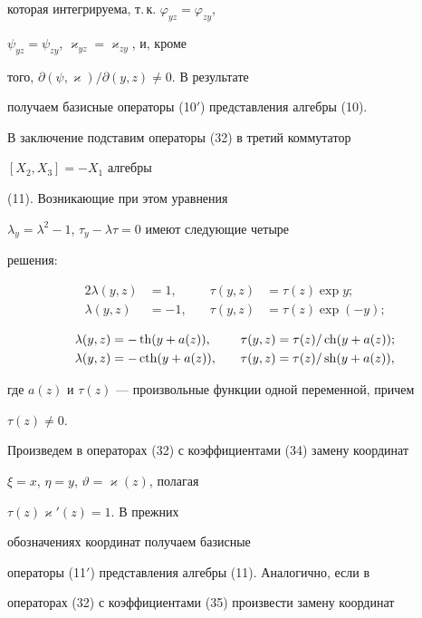 которая интегрируема, т.\,к. $\varphi_{yz}=\varphi_{zy}$, 


$\psi_{yz}=\psi_{zy}$, $\varkappa_{yz}=\varkappa_{zy}$, и, кроме 


того, $\partial(\psi,\varkappa)/\partial(y,z)\ne 0$. В результате 


получаем базисные операторы (10${}'$) представления алгебры (10). 


 


В заключение подставим операторы (32) в третий коммутатор 


$[X_2,X_3]=-X_1$ алгебры 


(11). Возникающие при этом уравнения 


$\lambda_y=\lambda^2-1$, $\tau_y-\lambda\tau=0$ имеют следующие четыре 


решения: 


\begin{alignat}{2} 


\lambda(y,z)&=1, &\quad \tau(y,z)&=\tau(z)\exp y;\\ 


\lambda(y,z)&=-1, &\quad \tau(y,z)&=\tau(z)\exp(-y); 


\end{alignat} 


\begin{alignat}{2} 


\lambda(y,z)&=-\th(y+a(z)), &\quad \tau(y,z)&=\tau(z)/\ch(y+a(z));\\ 


\lambda(y,z)&=-\cth(y+a(z)), &\quad \tau(y,z)&=\tau(z)/\sh(y+a(z)),


\end{alignat} 


где $a(z)$ и $\tau(z)$ --- произвольные функции одной переменной, причем 


$\tau(z)\ne 0$. 


 


Произведем в операторах (32) с коэффициентами (34) замену координат 


$\xi=x$, $\eta=y$, $\vartheta=\varkappa(z)$, полагая 


$\tau(z)\varkappa'(z)=1$. В прежних 


обозначениях координат получаем базисные 


операторы (11${}'$) представления алгебры (11). Аналогично, если в 


операторах (32) с коэффициентами (35) произвести замену координат 


